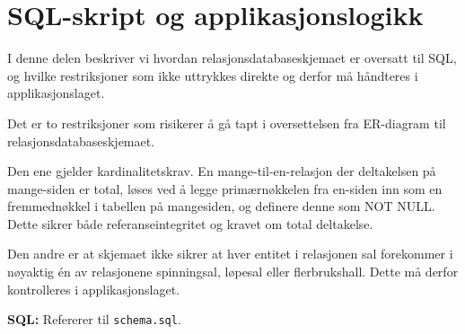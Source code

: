 \section{SQL-skript og applikasjonslogikk}

I denne delen beskriver vi hvordan relasjonsdatabaseskjemaet er oversatt til SQL, og hvilke restriksjoner som ikke uttrykkes direkte og derfor må håndteres i applikasjonslaget.

Det er to restriksjoner som risikerer å gå tapt i oversettelsen fra ER-diagram til relasjonsdatabaseskjemaet.

Den ene gjelder kardinalitetskrav. En mange-til-en-relasjon der deltakelsen på mange-siden er total, løses ved å legge primærnøkkelen fra en-siden inn som en fremmednøkkel i tabellen på mangesiden, og definere denne som NOT NULL. Dette sikrer både referanseintegritet og kravet om total deltakelse.

Den andre er at skjemaet ikke sikrer at hver entitet i relasjonen sal forekommer i nøyaktig én av relasjonene spinningsal, løpesal eller flerbrukshall. Dette må derfor kontrolleres i applikasjonslaget.

\textbf{SQL:} Refererer til \texttt{schema.sql}.


